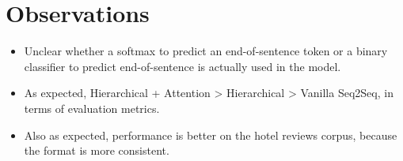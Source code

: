 \documentclass[12pt]{article}
\begin{document}
\section{Observations}
  \begin{itemize}
    \item Unclear whether a softmax to predict an end-of-sentence token or a binary classifier to predict end-of-sentence is actually used in the model.
    \item As expected, Hierarchical + Attention > Hierarchical > Vanilla Seq2Seq, in terms of evaluation metrics.
    \item Also as expected, performance is better on the hotel reviews corpus, because the format is more consistent.
  \end{itemize}



\end{document}
